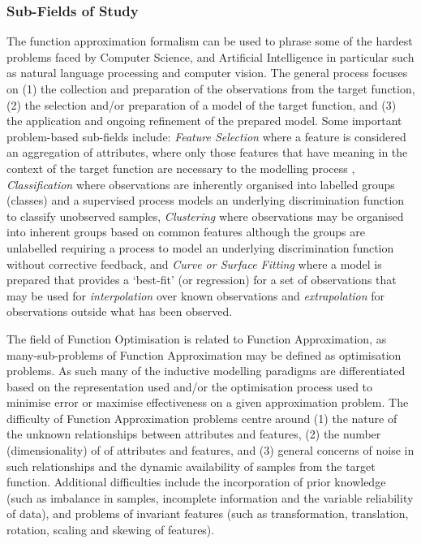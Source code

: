 %
%
\subsubsection{Sub-Fields of Study}
The function approximation formalism can be used to phrase some of the hardest problems faced by Computer Science, and Artificial Intelligence in particular such as natural language processing and computer vision. 
The general process focuses on (1) the collection and preparation of the observations from the target function, (2) the selection and/or preparation of a model of the target function, and (3) the application and ongoing refinement of the prepared model. 
Some important problem-based sub-fields include: \emph{Feature Selection} where a feature is considered an aggregation of attributes, where only those features that have meaning in the context of the target function are necessary to the modelling process \cite{Kudo2000, Guyon2003}, \emph{Classification} where observations are inherently organised into labelled groups (classes) and a supervised process models an underlying discrimination function to classify unobserved samples, \emph{Clustering} where observations may be organised into inherent groups based on common features although the groups are unlabelled requiring a process to model an underlying discrimination function without corrective feedback, and \emph{Curve or Surface Fitting} where a model is prepared that provides a `best-fit' (or regression) for a set of observations that may be used for \emph{interpolation} over known observations and \emph{extrapolation} for observations outside what has been observed.

The field of Function Optimisation is related to Function Approximation, as many-sub-problems of Function Approximation may be defined as optimisation problems. As such many of the inductive modelling paradigms are differentiated based on the representation used and/or the optimisation process used to minimise error or maximise effectiveness on a given approximation problem. 
The difficulty of Function Approximation problems centre around (1) the nature of the unknown relationships between attributes and features, (2) the number (dimensionality) of of attributes and features, and (3) general concerns of noise in such relationships and the dynamic availability of samples from the target function.
Additional difficulties include the incorporation of prior knowledge (such as imbalance in samples, incomplete information and the variable reliability of data), and problems of invariant features (such as transformation, translation, rotation, scaling and skewing of features).

